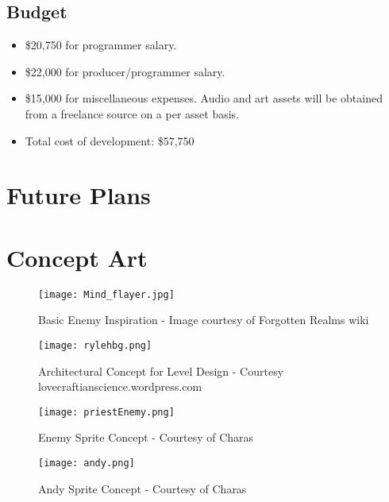 \documentclass [12pt]{article}
\begin{document}
\subsection*{Budget}

\begin{itemize}
\item \$20,750 for programmer salary.
\item \$22,000 for producer/programmer salary.
\item \$15,000 for miscellaneous expenses. Audio and art assets will be obtained from a freelance source on a per asset basis.
\item Total cost of development: \$57,750
\end{itemize}
\newpage

\section*{Future Plans}

\section*{Concept Art}
\begin{figure}[!htb]
	\texttt{[image: Mind\_flayer.jpg]}
	\caption{Basic Enemy Inspiration - Image courtesy of Forgotten Realms wiki}
\end{figure}

\begin{figure}[!htb]
\centering
	\texttt{[image: rylehbg.png]}
	\caption{Architectural Concept for Level Design - Courtesy lovecraftianscience.wordpress.com}
\end{figure}
\clearpage

\begin{figure}[!htb]
\centering
	\texttt{[image: priestEnemy.png]}
	\caption{Enemy Sprite Concept - Courtesy of Charas}
\end{figure}

\begin{figure}[!htb]
\centering
	\texttt{[image: andy.png]}
	\caption{Andy Sprite Concept - Courtesy of Charas}
\end{figure}
\end{document}
